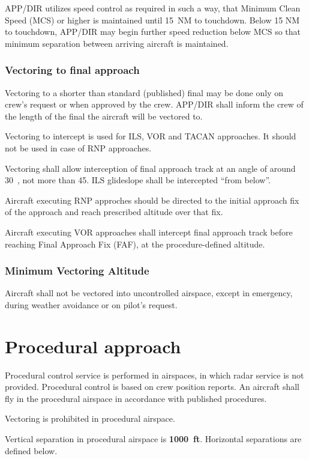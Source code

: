 APP/DIR utilizes speed control as required in such a way, that Minimum Clean
Speed (MCS) or higher is maintained until 15~NM to touchdown. Below 15 NM to
touchdown, APP/DIR may begin further speed reduction below MCS so that minimum
separation between arriving aircraft is maintained.

\subsubsection{Vectoring to final approach}

Vectoring to a shorter than standard (published) final may be done only on
crew's request or when approved by the crew. APP/DIR shall inform the crew of
the length of the final the aircraft will be vectored to.

Vectoring to intercept is used for ILS, VOR and TACAN approaches. It should not
be used in case of RNP approaches.

Vectoring shall allow interception of final approach track at an angle of around
30~\degree, not more than 45{\degree}. ILS glideslope shall be intercepted
``from below''.

Aircraft executing RNP approches should be directed to the initial approach fix
of the approach and reach prescribed altitude over that fix.

Aircraft executing VOR approaches shall intercept final approach track before
reaching Final Approach Fix (FAF), at the procedure-defined altitude.

\subsubsection{Minimum Vectoring Altitude} Aircraft shall not be vectored into
uncontrolled airspace, except in emergency, during weather avoidance or on
pilot's request.

\section{Procedural approach}
\label{sec:app:procedural}

Procedural control service is performed in airspaces, in which radar service is
not provided. Procedural control is based on crew position reports. An aircraft
shall fly in the procedural airspace in accordance with published procedures.

Vectoring is prohibited in procedural airspace.

Vertical separation in procedural airspace is \textbf{1000~ft}. Horizontal
separations are defined below.

